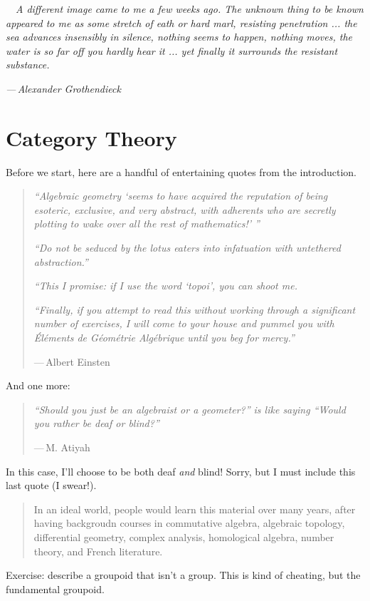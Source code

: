 \epigraph{$\quad$\emph{A different image came to me a few weeks ago. The unknown thing to be known appeared to me as some stretch of eath or hard marl, resisting penetration ... the sea advances insensibly in silence, nothing seems to happen, nothing moves, the water is so far off you hardly hear it ... yet finally it surrounds the resistant substance.}}{\emph{—\,Alexander Grothendieck}}
\section{Category Theory}
Before we start, here are a handful of entertaining quotes from the introduction.
\begin{quotation}
    \emph{``Algebraic geometry `seems to have acquired the reputation of being esoteric, exclusive, and very abstract, with adherents who are secretly plotting to wake over all the rest of mathematics!' ''}

    \emph{``Do not be seduced by the lotus eaters into infatuation with untethered abstraction.''}

    \emph{``This I promise: if I use the word `topoi', you can shoot me.}

    \emph{``Finally, if you attempt to read this without working through a significant number of exercises, I will come to your house and pummel you with \emph{\'El\'ements de G\'eom\'etrie Alg\'ebrique} until you beg for mercy.''}

    —\,Albert Einsten
\end{quotation}
And one more:
\begin{quote}
    \emph{``Should you just be an algebraist or a geometer?'' is like saying ``Would you rather be deaf or blind?''}

    —\,M. Atiyah
\end{quote}
In this case, I'll choose to be both deaf \emph{and} blind! Sorry, but I must include this last quote (I swear!).
\begin{quote}
    In an ideal world, people would learn this material over many years, after having backgroudn courses in commutative algebra, algebraic topology, differential geometry, complex analysis, homological algebra, number theory, and French literature.
\end{quote}
Exercise: describe a groupoid that isn't a group. This is kind of cheating, but the fundamental groupoid. 

